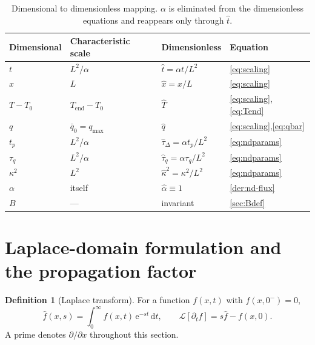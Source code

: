 \documentclass[11pt,a4paper]{article}
\theoremstyle{definition}
\newtheorem{definitionx}{Definition}[section]
\newcommand{\tq}{\tau_{q}}
\newcommand{\kk}{\kappa^{2}}
\newcommand{\Bnum}{B}
\newcommand{\Lap}[1]{\hat{#1}}
\begin{document}
\begin{table}[H]
\centering
\caption{Dimensional to dimensionless mapping. $\alpha$ is eliminated from the
         dimensionless equations and reappears only through $\hat t$.}
\label{tab:mapping}
\small
\begin{tabular}{@{}llll@{}}
\toprule
\textbf{Dimensional} & \textbf{Characteristic scale} &
\textbf{Dimensionless} & \textbf{Equation} \\
\midrule
$t$        & $L^{2}/\alpha$                  & $\hat t=\alpha t/L^{2}$
           & \eqref{eq:scaling} \\
$x$        & $L$                             & $\hat x=x/L$
           & \eqref{eq:scaling} \\
$T-T_{0}$  & $T_{\mathrm{end}}-T_{0}$        & $\hat T$
           & \eqref{eq:scaling},\eqref{eq:Tend} \\
$q$        & $\bar q_{0}=q_{\max}$           & $\hat q$
           & \eqref{eq:scaling},\eqref{eq:qbar} \\
$t_{p}$    & $L^{2}/\alpha$                  &
  $\hat\tau_{\Delta}=\alpha t_{p}/L^{2}$     & \eqref{eq:ndparams} \\
$\tq$      & $L^{2}/\alpha$                  &
  $\hat\tau_{q}=\alpha \tq/L^{2}$            & \eqref{eq:ndparams} \\
$\kk$      & $L^{2}$                         &
  $\hat\kappa^{2}=\kk/L^{2}$                 & \eqref{eq:ndparams} \\
$\alpha$   & itself                          & $\hat\alpha\equiv1$
           & \cref{der:nd-flux} \\
$\Bnum$    & ---                             & invariant
           & \cref{sec:Bdef} \\
\bottomrule
\end{tabular}
\end{table}

\section{Laplace-domain formulation and the propagation factor}
\label{sec:laplace}

\begin{definitionx}[Laplace transform]
\label{def:laplace}
For a function $f(x,t)$ with $f(x,0^{-})=0$,
\begin{equation}
  \Lap f(x,s) = \int_{0}^{\infty} f(x,t)\,\mathrm{e}^{-st}\,\mathrm{d}t ,
  \qquad
  \mathcal{L}\!\left[\partial_{t}f\right] = s\Lap f - f(x,0) .
  \label{eq:laplace-def}
\end{equation}
A prime denotes $\partial/\partial x$ throughout this section.
\end{definitionx}
\end{document}
